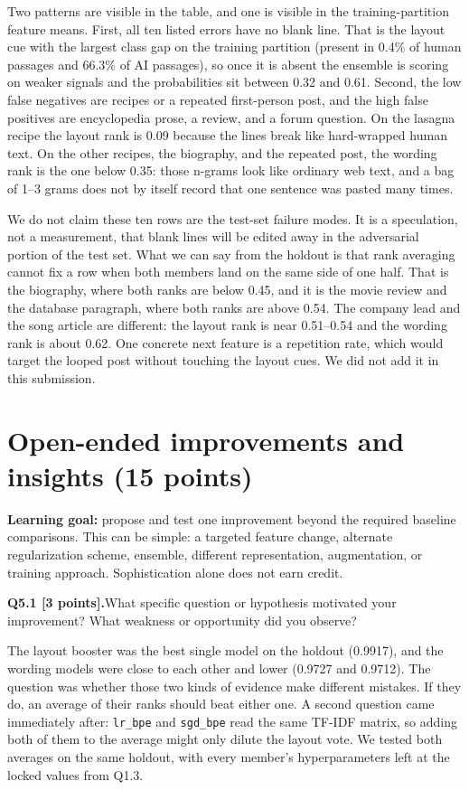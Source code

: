 \documentclass[11pt,letterpaper]{article}
\newcommand{\question}[2]{\needspace{4\baselineskip}\par\addvspace{0.45em}\noindent\textbf{#1}\quad #2\par\nobreak\vspace{0.1em}}
\begin{document}
Two patterns are visible in the table, and one is visible in the training-partition feature means. First, all ten listed errors have no blank line. That is the layout cue with the largest class gap on the training partition (present in 0.4\% of human passages and 66.3\% of AI passages), so once it is absent the ensemble is scoring on weaker signals and the probabilities sit between 0.32 and 0.61. Second, the low false negatives are recipes or a repeated first-person post, and the high false positives are encyclopedia prose, a review, and a forum question. On the lasagna recipe the layout rank is 0.09 because the lines break like hard-wrapped human text. On the other recipes, the biography, and the repeated post, the wording rank is the one below 0.35: those n-grams look like ordinary web text, and a bag of 1--3 grams does not by itself record that one sentence was pasted many times.

We do not claim these ten rows are the test-set failure modes. It is a speculation, not a measurement, that blank lines will be edited away in the adversarial portion of the test set. What we can say from the holdout is that rank averaging cannot fix a row when both members land on the same side of one half. That is the biography, where both ranks are below 0.45, and it is the movie review and the database paragraph, where both ranks are above 0.54. The company lead and the song article are different: the layout rank is near 0.51--0.54 and the wording rank is about 0.62. One concrete next feature is a repetition rate, which would target the looped post without touching the layout cues. We did not add it in this submission.

\newpage
\section{Open-ended improvements and insights (15 points)}
\textbf{Learning goal:} propose and test one improvement beyond the required baseline comparisons. This can be simple: a targeted feature change, alternate regularization scheme, ensemble, different representation, augmentation, or training approach. Sophistication alone does not earn credit.

\question{Q5.1 [3 points].}{What specific question or hypothesis motivated your improvement? What weakness or opportunity did you observe?}

The layout booster was the best single model on the holdout (0.9917), and the wording models were close to each other and lower (0.9727 and 0.9712). The question was whether those two kinds of evidence make different mistakes. If they do, an average of their ranks should beat either one. A second question came immediately after: \texttt{lr\_bpe} and \texttt{sgd\_bpe} read the same TF-IDF matrix, so adding both of them to the average might only dilute the layout vote. We tested both averages on the same holdout, with every member's hyperparameters left at the locked values from Q1.3.
\end{document}
